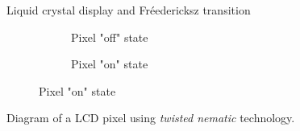 \documentclass{beamer}
\begin{document}
\begin{frame}{Liquid crystal display and Fréedericksz transition}
    \begin{figure}[h!]
    \center
        \begin{subfigure}[b]{0.49\textwidth}
        	\center
        	\caption{Pixel "off" state}
        	\label{allume}
        \end{subfigure}	
        \begin{subfigure}[b]{0.49\textwidth}
        	\center
        	\caption{Pixel "on" state}
        	\label{etteint}
        \end{subfigure}	
        
        \label{freedericksz} 
    \end{figure}

\center
Diagram of a LCD pixel using \textit{twisted nematic} technology.
\end{frame}
\end{document}
